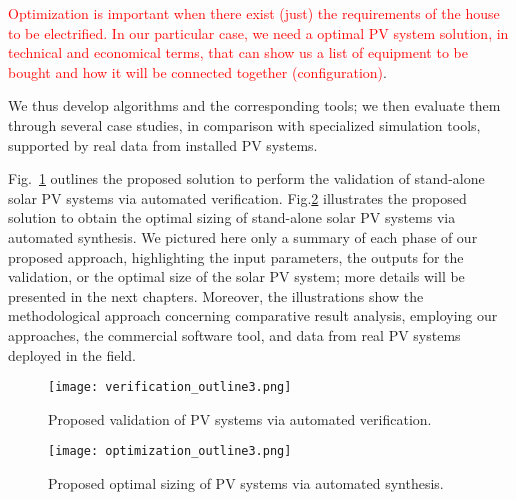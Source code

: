 \textcolor{red}{Optimization is important when there exist (just) the requirements of the house to be electrified. In our particular case, we need a optimal PV system solution, in technical and economical terms, that can show us a list of equipment to be bought and how it will be connected together (configuration)}. 

We thus develop algorithms and the corresponding tools; we then evaluate them through several case studies, in comparison with specialized simulation tools, supported by real data from installed PV systems.

Fig.~\ref{fig:validation_outline} outlines the proposed solution to perform the validation of stand-alone solar PV systems via automated verification. Fig.\ref{fig:optimization_outline} illustrates the proposed solution to obtain the optimal sizing of stand-alone solar PV systems via automated synthesis. We pictured here only a summary of each phase of our proposed approach, highlighting the input parameters, the outputs for the validation, or the optimal size of the solar PV system; more details will be presented in the next chapters. Moreover, the illustrations show the methodological approach concerning comparative result analysis, employing our approaches, the commercial software tool, and data from real PV systems deployed in the field.

\begin{figure}[h]
\texttt{[image: verification\_outline3.png]}
\centering
\caption{Proposed validation of PV systems via automated verification.}
\label{fig:validation_outline} 
\end{figure}


\begin{figure}[h]
\texttt{[image: optimization\_outline3.png]}
\centering
\caption{Proposed optimal sizing of PV systems via automated synthesis.}
\label{fig:optimization_outline} 
\end{figure}

